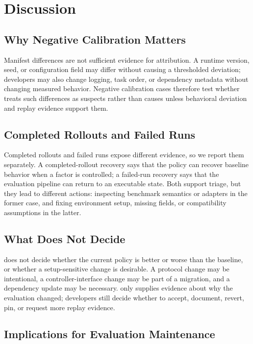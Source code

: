 \section{Discussion}
\label{sec:discussion-threats}

\subsection{Why Negative Calibration Matters}

Manifest differences are not sufficient evidence for attribution. A runtime version, seed, or configuration field may differ without causing a thresholded deviation; developers may also change logging, task order, or dependency metadata without changing measured behavior. Negative calibration cases therefore test whether \sys treats such differences as suspects rather than causes unless behavioral deviation and replay evidence support them.

\subsection{Completed Rollouts and Failed Runs}

Completed rollouts and failed runs expose different evidence, so we report them separately. A completed-rollout recovery says that the policy can recover baseline behavior when a factor is controlled; a failed-run recovery says that the evaluation pipeline can return to an executable state. Both support triage, but they lead to different actions: inspecting benchmark semantics or adapters in the former case, and fixing environment setup, missing fields, or compatibility assumptions in the latter.

\subsection{What \sys Does Not Decide}

\sys does not decide whether the current policy is better or worse than the baseline, or whether a setup-sensitive change is desirable. A protocol change may be intentional, a controller-interface change may be part of a migration, and a dependency update may be necessary. \sys only supplies evidence about why the evaluation changed; developers still decide whether to accept, document, revert, pin, or request more replay evidence.

\subsection{Implications for Evaluation Maintenance}

